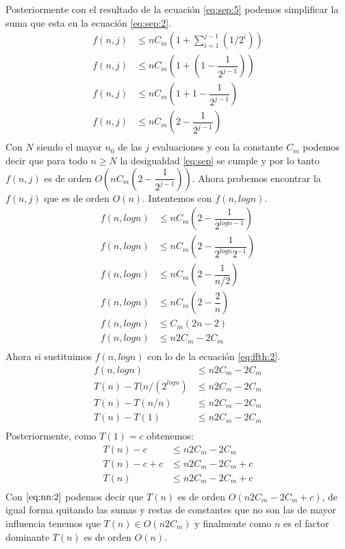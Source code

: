 \documentclass[12pt]{article}
\begin{document}
Posteriormente con el resultado de la ecuación \ref{eq:sep:5} podemos simplificar la suma que esta en la ecuación \ref{eq:sep:2}.
\begin{equation}\label{eq:sep:6}
\begin{split}
f(n,j) & \leq nC_m (1 + \sum_{i=1}^{j-1}{(1/2^{i})}) \\
f(n,j) & \leq nC_m (1 + (1 - \dfrac{1}{2^{j-1}} )) \\
f(n,j) & \leq nC_m (1 + 1 - \dfrac{1}{2^{j-1}} ) \\
f(n,j) & \leq nC_m (2 - \dfrac{1}{2^{j-1}} ) \\
\end{split}
\end{equation}
Con $N$ siendo el mayor $n_0$ de las $j$ evaluaciones y con la constante $C_m$ podemos decir que para todo $n\geq N$ la desigualdad \eqref{eq:sep} se cumple y por lo tanto $f(n,j)$ es de orden $O(nC_m (2 - \dfrac{1}{2^{j-1}} ))$.
Ahora probemos encontrar la $f(n,j)$ que es de orden $O(n)$. Intentemos con $f(n,logn)$.
\begin{equation}\label{eq:oct:2}
\begin{split}
f(n,logn) & \leq nC_m (2 - \dfrac{1}{2^{logn-1}} ) \\
f(n,logn) &  \leq nC_m (2 - \dfrac{1}{2^{logn} 2^{-1}} ) \\
f(n,logn) & \leq nC_m (2 - \dfrac{1}{n/2} ) \\
f(n,logn) & \leq nC_m (2 - \dfrac{2}{n} ) \\
f(n,logn) & \leq C_m (2n - 2) \\
f(n,logn) & \leq n2C_m - 2C_m \\
\end{split}
\end{equation}
Ahora si sustituimos $f(n,logn)$ con lo de la ecuación \ref{eq:ffth:2}.
\begin{equation}\label{eq:oct:3}
\begin{split}
f(n,logn)  & \leq n2C_m - 2C_m \\
T(n)-T(n/(2^{logn}) & \leq n2C_m - 2C_m \\
T(n)-T(n/n)  & \leq n2C_m - 2C_m \\
T(n)-T(1) & \leq n2C_m - 2C_m \\
\end{split}
\end{equation}
Posteriormente, como $T(1)=c$ obtenemos:
\begin{equation}\label{eq:nn:2}
\begin{split}
T(n)-c  & \leq n2C_m - 2C_m \\
T(n)-c+c & \leq n2C_m - 2C_m + c\\
T(n) & \leq n2C_m - 2C_m + c\\
\end{split}
\end{equation}
Con $\eqref{eq:nn:2}$ podemos decir que $T(n)$ es de orden $O(n2C_m - 2C_m + c)$, de igual forma quitando las sumas y restas de constantes que no son las de mayor influencia tenemos que $T(n) \in O(n2C_m)$ y finalmente como $n$ es el factor dominante $T(n)$ es de orden $O(n)$.\\
\pagebreak
\end{document}

